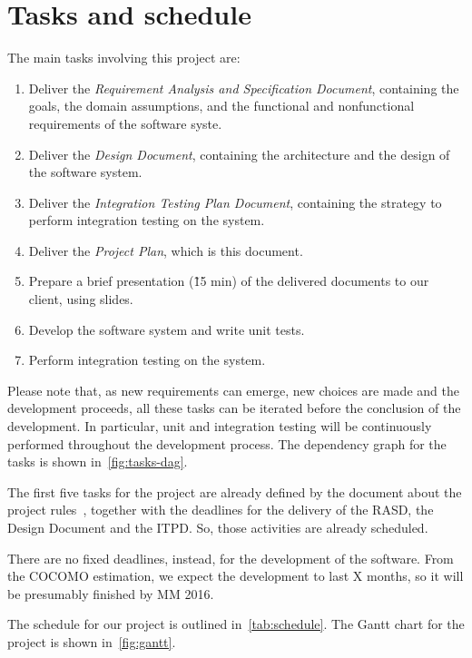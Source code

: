 \chapter{Tasks and schedule}
\label{chap:tasks}

The main tasks involving this project are:
\begin{enumerate}
    \item Deliver the \emph{Requirement Analysis and Specification Document}, containing the goals, the domain assumptions, and the functional and nonfunctional requirements of the software syste.
    \item Deliver the \emph{Design Document}, containing the architecture and the design of the software system.
    \item Deliver the \emph{Integration Testing Plan Document}, containing the strategy to perform integration testing on the system.
    \item Deliver the \emph{Project Plan}, which is this document.
    \item Prepare a brief presentation (\~15 min) of the delivered documents to our client, using slides.
    \item Develop the software system and write unit tests.
    \item Perform integration testing on the system.
\end{enumerate}

Please note that, as new requirements can emerge, new choices are made and the development proceeds, all these tasks can be iterated before the conclusion of the development. In particular, unit and integration testing will be continuously performed throughout the development process. The dependency graph for the tasks is shown in~\autoref{fig:tasks-dag}.

The first five tasks for the project are already defined by the document about the project rules~\cite{se-project-rules}, together with the deadlines for the delivery of the RASD, the Design Document and the ITPD.
So, those activities are already scheduled.

There are no fixed deadlines, instead, for the development of the software. From the COCOMO estimation, we expect the development to last X months, so it will be presumably finished by MM 2016.

The schedule for our project is outlined in~\autoref{tab:schedule}. The Gantt chart for the project is shown in~\autoref{fig:gantt}.

